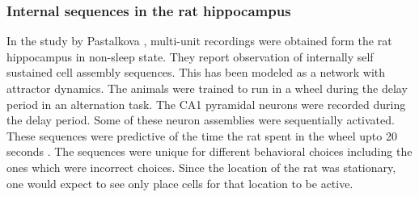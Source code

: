 \subsubsection{Internal sequences in the rat hippocampus}
In the study by Pastalkova \cite{Pastalkova2008a}, multi-unit recordings were obtained form the rat hippocampus in non-sleep state. They report observation of internally self sustained cell assembly sequences. This has been modeled as a network with attractor dynamics. The animals were trained to run in a wheel during the delay period in an alternation task. The CA1 pyramidal neurons were recorded during the delay period. Some of these neuron assemblies were sequentially activated. These sequences were predictive of the time the rat spent in the wheel upto 20 seconds \cite{Itskov2011a}. The sequences were unique for different behavioral choices including the ones which were incorrect choices. Since the location of the rat was stationary, one would expect to see only place cells for that location to be active.  \\  
